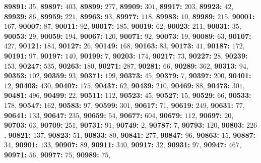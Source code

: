 \textsf{\bfseries 89891:} $35$, \textsf{\bfseries 89897:} $403$, \textsf{\bfseries 89899:} $277$, \textsf{\bfseries 89909:} $301$, \textsf{\bfseries 89917:} $203$, \textsf{\bfseries 89923:} $42$, \textsf{\bfseries 89939:} $86$, \textsf{\bfseries 89959:} $221$, \textsf{\bfseries 89963:} $93$, \textsf{\bfseries 89977:} $118$, \textsf{\bfseries 89983:} $10$, \textsf{\bfseries 89989:} $215$, \textsf{\bfseries 90001:} $167$, \textsf{\bfseries 90007:} $87$, \textsf{\bfseries 90011:} $92$, \textsf{\bfseries 90017:} $185$, \textsf{\bfseries 90019:} $62$, \textsf{\bfseries 90023:} $211$, \textsf{\bfseries 90031:} $35$, \textsf{\bfseries 90053:} $29$, \textsf{\bfseries 90059:} $194$, \textsf{\bfseries 90067:} $120$, \textsf{\bfseries 90071:} $92$, \textsf{\bfseries 90073:} $19$, \textsf{\bfseries 90089:} $63$, \textsf{\bfseries 90107:} $427$, \textsf{\bfseries 90121:} $184$, \textsf{\bfseries 90127:} $26$, \textsf{\bfseries 90149:} $168$, \textsf{\bfseries 90163:} $83$, \textsf{\bfseries 90173:} $41$, \textsf{\bfseries 90187:} $172$, \textsf{\bfseries 90191:} $97$, \textsf{\bfseries 90197:} $140$, \textsf{\bfseries 90199:} $7$, \textsf{\bfseries 90203:} $174$, \textsf{\bfseries 90217:} $73$, \textsf{\bfseries 90227:} $28$, \textsf{\bfseries 90239:} $153$, \textsf{\bfseries 90247:} $535$, \textsf{\bfseries 90263:} $180$, \textsf{\bfseries 90271:} $287$, \textsf{\bfseries 90281:} $66$, \textsf{\bfseries 90289:} $362$, \textsf{\bfseries 90313:} $94$, \textsf{\bfseries 90353:} $102$, \textsf{\bfseries 90359:} $93$, \textsf{\bfseries 90371:} $199$, \textsf{\bfseries 90373:} $45$, \textsf{\bfseries 90379:} $7$, \textsf{\bfseries 90397:} $200$, \textsf{\bfseries 90401:} $12$, \textsf{\bfseries 90403:} $430$, \textsf{\bfseries 90407:} $175$, \textsf{\bfseries 90437:} $62$, \textsf{\bfseries 90439:} $210$, \textsf{\bfseries 90469:} $88$, \textsf{\bfseries 90473:} $301$, \textsf{\bfseries 90481:} $496$, \textsf{\bfseries 90499:} $22$, \textsf{\bfseries 90511:} $112$, \textsf{\bfseries 90523:} $45$, \textsf{\bfseries 90527:} $15$, \textsf{\bfseries 90529:} $66$, \textsf{\bfseries 90533:} $178$, \textsf{\bfseries 90547:} $162$, \textsf{\bfseries 90583:} $97$, \textsf{\bfseries 90599:} $301$, \textsf{\bfseries 90617:} $71$, \textsf{\bfseries 90619:} $249$, \textsf{\bfseries 90631:} $77$, \textsf{\bfseries 90641:} $133$, \textsf{\bfseries 90647:} $235$, \textsf{\bfseries 90659:} $54$, \textsf{\bfseries 90677:} $604$, \textsf{\bfseries 90679:} $112$, \textsf{\bfseries 90697:} $20$, \textsf{\bfseries 90703:} $63$, \textsf{\bfseries 90709:} $251$, \textsf{\bfseries 90731:} $91$, \textsf{\bfseries 90749:} $2$, \textsf{\bfseries 90787:} $7$, \textsf{\bfseries 90793:} $120$, \textsf{\bfseries 90803:} $226$, \textsf{\bfseries 90821:} $137$, \textsf{\bfseries 90823:} $51$, \textsf{\bfseries 90833:} $80$, \textsf{\bfseries 90841:} $277$, \textsf{\bfseries 90847:} $96$, \textsf{\bfseries 90863:} $15$, \textsf{\bfseries 90887:} $34$, \textsf{\bfseries 90901:} $133$, \textsf{\bfseries 90907:} $89$, \textsf{\bfseries 90911:} $340$, \textsf{\bfseries 90917:} $32$, \textsf{\bfseries 90931:} $97$, \textsf{\bfseries 90947:} $467$, \textsf{\bfseries 90971:} $56$, \textsf{\bfseries 90977:} $75$, \textsf{\bfseries 90989:} $75$, 
